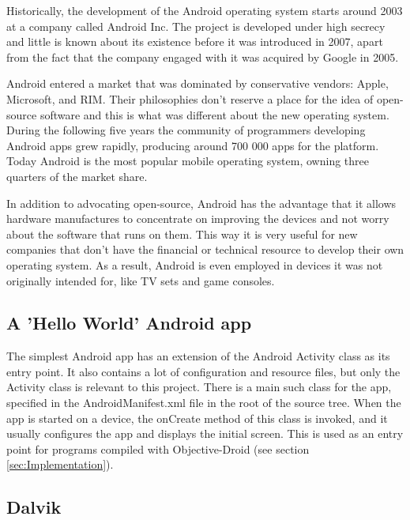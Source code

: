 \documentclass[parskip]{cs4rep}
\begin{document}
Historically, the development of the Android operating system starts around 2003 at a company called Android Inc.\cite{BloombergBusinessweek2005} The project is developed under high secrecy and little is known about its existence before it was introduced in 2007, apart from the fact that the company engaged with it was acquired by Google in 2005.

Android entered a market that was dominated by conservative vendors: Apple, Microsoft, and RIM. Their philosophies don't reserve a place for the idea of open-source software and this is what was different about the new operating system. During the following five years the community of programmers developing Android apps grew rapidly, producing around 700 000 apps for the platform\cite{Islam2012}. Today Android is the most popular mobile operating system, owning three quarters of the market share\cite{IDC2012}.

In addition to advocating open-source, Android has the advantage that it allows hardware manufactures to concentrate on improving the devices and not worry about the software that runs on them. This way it is very useful for new companies that don't have the financial or technical resource to develop their own operating system. As a result, Android is even employed in devices it was not originally intended for, like TV sets and game consoles\cite{Telecompaper2012}\cite{Etherington2013}.

\subsection{A 'Hello World' Android app} \label{sec:AndroidHelloWorld}

The simplest Android app has an extension of the Android Activity class as its entry point. It also contains a lot of configuration and resource files, but only the Activity class is relevant to this project. There is a main such class for the app, specified in the AndroidManifest.xml file in the root of the source tree. When the app is started on a device, the onCreate method of this class is invoked, and it usually configures the app and displays the initial screen. This is used as an entry point for programs compiled with Objective-Droid (see section \ref{sec:Implementation}).

\subsection{Dalvik}
\end{document}
